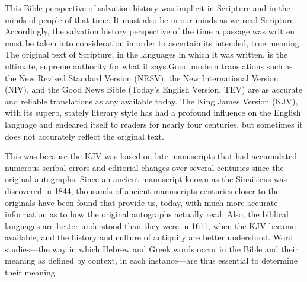 This Bible perspective of salvation history was implicit in Scripture and in
the minds of people of that time. It must also be in our minds as we read
Scripture. Accordingly, the salvation history perspective of the time a
passage was written must be taken into consideration in order to ascertain
its intended, true meaning.
\newpage
The original text of Scripture, in the languages in which it was written, is
the ultimate, supreme authority for what it says.Good modern translations
such as the New Revised Standard Version (NRSV), the New International 
Version (NIV), and the Good News Bible (Today's English Version, TEV) are as
accurate and reliable translations as any available today. The King James
Version (KJV), with its superb, stately literary style has had a profound
influence on the English language and endeared itself to readers for nearly
four centuries, but sometimes it does not accurately reflect the original
text.

This was because the KJV was based on late manuscripts that had accumulated
numerous scribal errors and editorial changes over several centuries since
the original autographs. Since an ancient manuscript known as the Sinaiticus
was discovered in 1844, thousands of ancient manuscripts centuries closer to
the originals have been found that provide us, today, with much more
accurate information as to how the original autographs actually read.
Also, the biblical languages are better understood than they were in 1611,
when the KJV became available, and the history and culture of antiquity are
better understood. Word studies---the way in which Hebrew and Greek words
occur in the Bible and their meaning as defined by context, in each
instance---are thus essential to determine their meaning.

